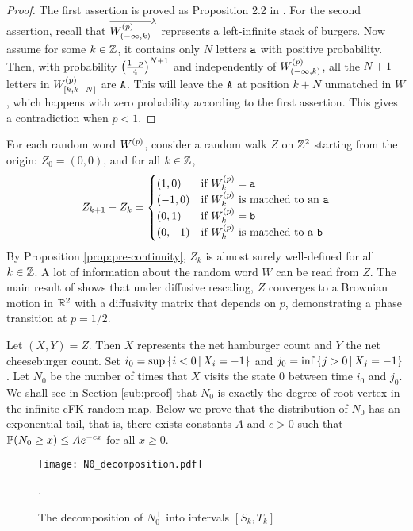 \documentclass[a4paper]{article}
\begin{document}
\begin{proof}
The first assertion is proved as Proposition 2.2 in \cite{She11}.
For the second assertion, recall that $\overline{W^{(p)}_{(-\infty,k)}}^\lambda$ represents a left-infinite stack of burgers.
Now assume for some $k\in\mathbb{Z}$, it contains only $N$ letters $\mathtt{a}$ with positive probability.
Then, with probability $\left(\frac{1-p}{4}\right)^{N+1}$ and independently of $W^{(p)}_{(-\infty,k)}$, all the $N+1$ letters in $W^{(p)}_{[k,k+N]}$ are $\mathtt{A}$.
This will leave the $\mathtt{A}$ at position $k+N$ unmatched in $W$, which happens with zero probability according to the first assertion.
This gives a contradiction when $p<1$.
\end{proof}

For each random word $W^{(p)}$, consider a random walk $Z$ on $\mathbb{Z}^2$ starting from the origin: $Z_0 = (0,0)$, and for all $k\in\mathbb{Z}$,
\begin{equation}\label{eq:random walk}
Z_{k+1} - Z_k = \begin{cases}
	(1,0)	&\text{if }W\ind{p}_k = \xa
\\	(-1,0)	&\text{if }W\ind{p}_k \text{ is matched to an } \xa
\\	(0,1)	&\text{if }W\ind{p}_k = \xb
\\	(0,-1)	&\text{if }W\ind{p}_k \text{ is matched to a } \xb
\end{cases}
\end{equation}
By Proposition \ref{prop:pre-continuity}, $Z_k$ is almost surely well-defined for all $k\in\mathbb{Z}$.
A lot of information about the random word $W$ can be read from $Z$.
The main result of \cite{She11} shows that under diffusive rescaling,
$Z$ converges to a Brownian motion in $\mathbb{R}^2$ with a diffusivity matrix that depends on $p$, demonstrating a phase transition at $p=1/2$.

Let $(X,Y)=Z$. Then $X$ represents the net hamburger count and $Y$ the net cheeseburger count.
Set $i_0 = \sup\left\{i<0\,\middle|\,X_i=-1\right\}$ and $j_0 = \inf\left\{j>0\,\middle|\,X_j=-1\right\}$.
Let $N_0$ be the number of times that $X$ visits the state $0$ between time $i_0$ and $j_0$.
We shall see in Section \ref{sub:proof} that $N_0$ is exactly the degree of root vertex in the infinite cFK-random map. Below we prove that the distribution of $N_0$ has an exponential tail, that is, there exists constants $A$ and $c>0$ such that $\mathbb{P}(N_0\geq x)\leq Ae^{-cx}$ for all $x\geq 0$.

\begin{figure}[ht!]
\begin{center}
\texttt{[image: N0\_decomposition.pdf]}
\caption{The decomposition of $N_0^+$ into intervals $[S_k,T_k]$}.
\label{fig:N0 decomposition}
\end{center}
\end{figure}
\end{document}
